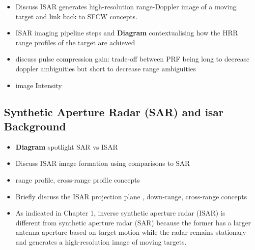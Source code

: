 \documentclass[class=report,11pt,crop=false]{standalone}
\begin{document}
    \begin{itemize}
        \item Discuss ISAR generates high-resolution range-Doppler image of a moving target and link back to SFCW concepts. %
        \item  ISAR imaging pipeline steps %
        and \textbf{Diagram} contextualising how the HRR range profiles of the target are achieved %
        \item discuss pulse compression gain: trade-off between PRF being long to decrease doppler ambiguities but short to decrease range ambiguities
        \item image Intensity
    \end{itemize}

    \subsection{Synthetic Aperture Radar (SAR) and \gls{isar} Background } %
        \begin{itemize}
            \item \textbf{Diagram} spotlight SAR vs ISAR
            \item Discuss ISAR image formation using comparisons to SAR
            \item range profile, cross-range profile concepts
            \item Briefly discuss the ISAR projection plane%
            , down-range, cross-range concepts %
        \end{itemize}
    
    \begin{itemize}
        \item As indicated in Chapter 1, inverse synthetic aperture radar (ISAR) is different from synthetic aperture radar (SAR) because the former has a larger antenna aperture based on target motion while the radar remains stationary and generates a high-resolution image of moving targets. %
    \end{itemize}
\end{document}
